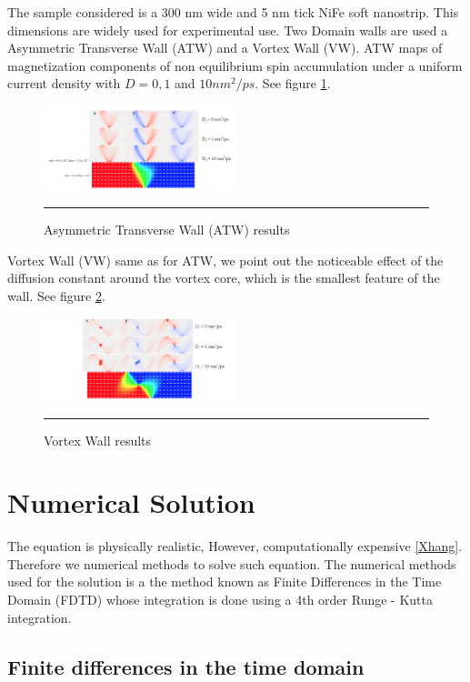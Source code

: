 The sample considered is a 300 nm wide and 5 nm tick NiFe soft nanostrip. This dimensions are widely used for experimental use. Two Domain walls are used a Asymmetric Transverse Wall (ATW) and a Vortex Wall (VW). ATW maps of magnetization components of non equilibrium spin accumulation under a uniform current density with $D = 0, 1$ and $10 nm^2 / ps$. See figure \ref{fig:atw}.

\begin{figure}[htbp]
	\centering
		\includegraphics[width=0.5\textwidth]{Figures/ATW.png}
		\rule{35em}{0.5pt}
	\caption[Asymmetric Transverse Wall results]{Asymmetric Transverse Wall (ATW) results}
	\label{fig:atw}
\end{figure}

Vortex Wall (VW) same as for ATW, we point out the noticeable effect of the diffusion constant around the vortex core, which is the smallest feature of the wall. See figure \ref{fig:vw}.

\begin{figure}[htbp]
	\centering
		\includegraphics[width=0.5\textwidth]{Figures/VW.png}
		\rule{35em}{0.5pt}
	\caption[Vortex Wall results]{Vortex Wall results}
	\label{fig:vw}
\end{figure}

\section{Numerical Solution}

The equation is physically realistic, However, computationally expensive \ref{Xhang}. Therefore we numerical methods to solve such equation. The numerical methods used for the solution is a the method known as Finite Differences in the Time Domain (FDTD) whose integration is done using a 4th order Runge - Kutta integration.

\subsection{Finite differences in the time domain}

